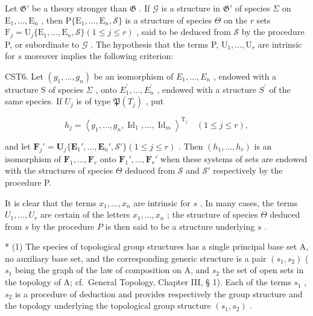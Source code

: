 Let \(\mathfrak{G}'\) be a theory stronger than \(\mathfrak{G}\) . If \(\mathcal{G}\) is a structure in \(\mathfrak{G}'\) of species \(\Sigma\) on \(\mathrm{E}_1, \ldots, \mathrm{E}_n\) , then \(\mathrm{P}\{\mathrm{E}_1, \ldots, \mathrm{E}_n, \mathcal{S}\}\) is a structure of species \(\Theta\) on the \(r\) sets \(\mathrm{F}_j = \mathrm{U}_j\{\mathrm{E}_1, \ldots, \mathrm{E}_n, \mathcal{S}\}(1 \leqslant j \leqslant r)\) , said to be deduced from \(\mathcal{S}\) by the procedure P, or subordinate to \(\mathcal{G}\) . The hypothesis that the terms P, \(\mathrm{U}_1, \ldots, \mathrm{U}_r\) are intrinsic for \(s\) moreover implies the following criterion:

CST6. Let \((g_{1}, \ldots, g_{n})\) be an isomorphism of \(E_{1}, \ldots, E_{n}\) , endowed with a structure S of species \(\Sigma\) , onto \(E_{1}^{\prime}, \ldots, E_{n}^{\prime}\) , endowed with a structure \(S^{\prime}\) of the same species. If \(U_{j}\) is of type \(\mathfrak{P}(T_{j})\) , put

\[
h _ {j} = \left\langle g _ {1}, \dots , g _ {n}, \operatorname{Id} _ {1}, \dots , \operatorname{Id} _ {m} \right\rangle^ {\mathrm{T}_j} \quad (1 \leqslant j \leqslant r),
\]

and let \(\mathbf{F}_j' = \mathbf{U}_j\{\mathbf{E}_1', \ldots, \mathbf{E}_n', \mathcal{S}'\} (1 \leqslant j \leqslant r)\) . Then \((h_1, \ldots, h_r)\) is an isomorphism of \(\mathbf{F}_1, \ldots, \mathbf{F}_r\) onto \(\mathbf{F}_1', \ldots, \mathbf{F}_r'\) when these systems of sets are endowed with the structures of species \(\Theta\) deduced from \(\mathcal{S}\) and \(\mathcal{S}'\) respectively by the procedure P.

It is clear that the terms \(x_{1}, \ldots, x_{n}\) are intrinsic for \(s\) . In many cases, the terms \(U_{1}, \ldots, U_{r}\) are certain of the letters \(x_{1}, \ldots, x_{n}\) ; the structure of species \(\Theta\) deduced from \(s\) by the procedure \(P\) is then said to be a structure underlying \(s\) .


* (1) The species of topological group structures has a single principal base set A, no auxiliary base set, and the corresponding generic structure is a pair \((s_1, s_2)\) ( \(s_1\) being the graph of the law of composition on A, and \(s_2\) the set of open sets in the topology of A; cf.~General Topology, Chapter III, § 1). Each of the terms \(s_1\) , \(s_2\) is a procedure of deduction and provides respectively the group structure and the topology underlying the topological group structure \((s_1, s_2)\) .

